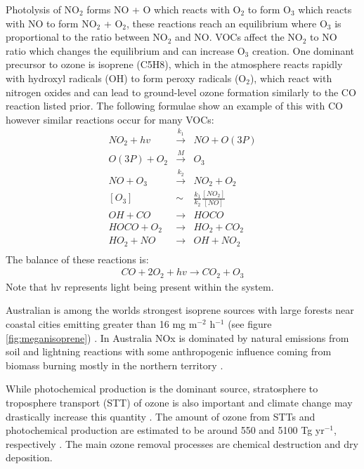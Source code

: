 Photolysis of NO$_2$ forms NO + O which reacts with O$_2$ to form O$_3$ which reacts with NO to form NO$_2$ + O$_2$, these reactions reach an equilibrium where O$_3$ is proportional to the ratio between NO$_2$ and NO.
VOCs affect the NO$_2$ to NO ratio which changes the equilibrium and can increase O$_3$ creation. 
One dominant precursor to ozone is isoprene (C5H8), which in the atmosphere reacts rapidly with hydroxyl radicals (OH) to form peroxy radicals (O$_2$), which react with nitrogen oxides and can lead to ground-level ozone formation similarly to the CO reaction listed prior.
The following formulae show an example of this with CO however similar reactions occur for many VOCs:
\begin{eqnarray*}
NO_2 + hv &\overset{k_1}{\rightarrow}& NO + O(3P) \\
O(3P) + O_2 &\overset{M}{\rightarrow}& O_3 \\
NO + O_3 &\overset{k_2}{\rightarrow}& NO_2 + O_2 \\
\left[O_3\right] &\sim& \frac{k_1}{k_2} \frac{\left[NO_2\right]}{\left[NO\right]} \\
OH + CO &{\rightarrow}& HOCO \\
HOCO + O_2 &{\rightarrow}& HO_2 + CO_2 \\
HO_2 + NO &{\rightarrow}& OH + NO_2 \\
\end{eqnarray*}
The balance of these reactions is:
\begin{eqnarray*} CO + 2O_2 + hv {\rightarrow} CO_2 + O_3 \end{eqnarray*}
Note that hv represents light being present within the system.

Australian is among the worlds strongest isoprene sources with large forests near coastal cities emitting greater than 16 mg m$^{-2}$ h$^{-1}$ (see figure \ref{fig:meganisoprene}) \citet{Guenther_2006}.
In Australia NOx is dominated by natural emissions from soil and lightning reactions with some anthropogenic influence coming from biomass burning mostly in the northern territory \cite{van_der_A_2008}.

While photochemical production is the dominant source, stratosphere to troposphere transport (STT) of ozone is also important and climate change may drastically increase this quantity \cite{Hegglin_2009}.
The amount of ozone from STTs and photochemical production are estimated to be around 550 and 5100 Tg yr$^{-1}$, respectively \cite{Stevenson_2006}. 
The main ozone removal processes are chemical destruction and dry deposition.

